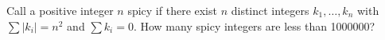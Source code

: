 Call a positive integer $n$ spicy if there exist $n$ distinct integers $k_1,\ldots,k_n$ with $\sum|k_i|=n^2$ and $\sum k_i=0$. How many spicy integers are less than 1000000?
